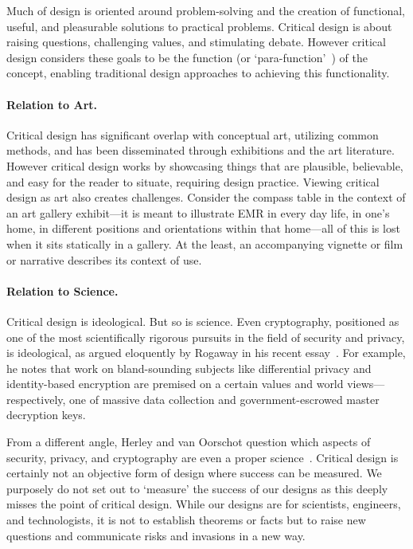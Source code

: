 Much of design is oriented around problem-solving and the creation of functional, useful, and pleasurable solutions to practical problems. Critical design is about raising questions, challenging values, and stimulating debate. However critical design considers these goals to be the function (or `para-function'~\cite{Dun05}) of the concept, enabling traditional design approaches to achieving this functionality. 

\paragraph{Relation to Art.} 

Critical design has significant overlap with conceptual art, utilizing common methods, and has been disseminated through exhibitions and the art literature. However critical design works by showcasing things that are plausible, believable, and easy for the reader to situate, requiring design practice. Viewing critical design as art also creates challenges. Consider the compass table in the context of an art gallery exhibit---it is meant to illustrate EMR in every day life, in one's home, in different positions and orientations within that home---all of this is lost when it sits statically in a gallery. At the least, an accompanying vignette or film or narrative describes its context of use.

\paragraph{Relation to Science.} 

Critical design is ideological. But so is science. Even cryptography, positioned as one of the most scientifically rigorous pursuits in the field of security and privacy, is ideological, as argued eloquently by Rogaway in his recent essay~\cite{Rog15}. For example, he notes that work on bland-sounding subjects like differential privacy and identity-based encryption are premised on a certain values and world views---respectively, one of massive data collection and government-escrowed master decryption keys. 

From a different angle, Herley and van Oorschot question which aspects of security, privacy, and cryptography are even a proper science~\cite{HvO17}. Critical design is certainly not an objective form of design where success can be measured. We purposely do not set out to `measure' the success of our designs as this deeply misses the point of critical design. While our designs are for scientists, engineers, and technologists, it is not to establish theorems or facts but to raise new questions and communicate risks and invasions in a new way.

